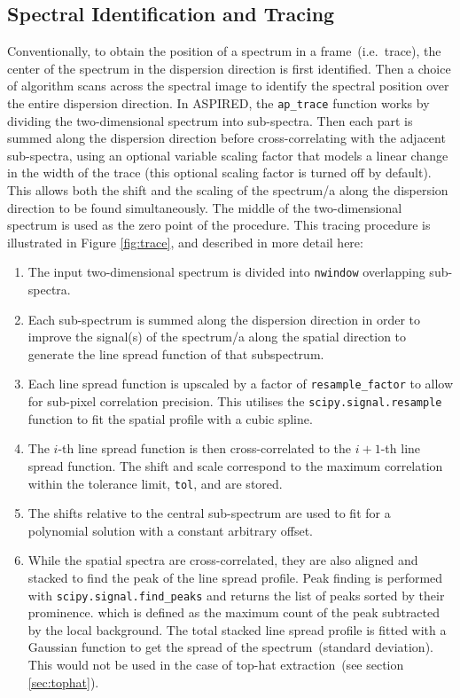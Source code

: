 \documentclass[linenumbers, twocolumn]{aastex631}
\begin{document}
\subsection{Spectral Identification and Tracing}
\label{sec:tracing}
Conventionally, to obtain the position of a spectrum in a frame~(i.e.\ trace),
the center of the spectrum in the dispersion direction is first identified. Then
a choice of algorithm scans across the spectral image to identify
the spectral position over the entire dispersion direction. In \textsc{ASPIRED},
the \texttt{ap\_trace} function works by dividing the two-dimensional spectrum
into sub-spectra. Then each part is summed along the dispersion direction
before cross-correlating with the adjacent sub-spectra, using an optional variable
scaling factor that models a linear change in the width of the trace (this optional scaling factor is turned off by default). This allows both the shift and the scaling of
the spectrum/a along the dispersion direction to be found simultaneously. The
middle of the two-dimensional spectrum is used as the zero point of the
procedure. This tracing procedure is illustrated in Figure \ref{fig:trace}, and described in more detail here:
\begin{enumerate}
    \item
        The input two-dimensional spectrum is divided into \texttt{nwindow}
        overlapping sub-spectra.
    \item
        Each sub-spectrum is summed along the dispersion direction
        in order to improve the signal(s) of the spectrum/a along
        the spatial direction to generate the line spread function
        of that subspectrum.
    \item
        Each line spread function is upscaled by a factor of
        \texttt{resample\_factor} to allow for sub-pixel correlation
        precision. This utilises the \texttt{scipy.signal.resample}
        function to fit the spatial profile with a cubic spline.
    \item
        The $i$-th line spread function is then cross-correlated to the $i+1$-th
        line spread function. The shift and scale correspond to the maximum
        correlation within the tolerance limit, \texttt{tol}, and are stored.
    \item
        The shifts relative to the central sub-spectrum are used to
        fit for a polynomial solution with a constant arbitrary offset.
    \item
        While the spatial spectra are cross-correlated, they are also
        aligned and stacked to find the peak of the line spread profile.
        Peak finding is performed with \texttt{scipy.signal.find\_peaks}
        and returns the list of peaks sorted by their prominence. which is
        defined as the maximum count of the peak subtracted by the local
        background. The total stacked line spread profile is fitted with
        a Gaussian function to get the spread of the spectrum~(standard
        deviation). This would not be used in the case of top-hat
        extraction~(see section \textsection\ref{sec:tophat}).
\end{enumerate}
\end{document}
